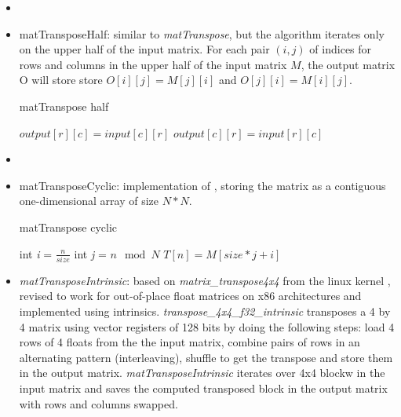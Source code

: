 \documentclass[conference]{IEEEtran}
\begin{document}
\begin{itemize}
\item \item{matTransposeHalf}: similar to \textit{matTranspose}, but the algorithm
  iterates only on the upper half of the input matrix. For each
  pair $(i,j)$ of indices for rows and columns in the upper half of the input matrix $M$, the output matrix O will
  store store $O[i][j]=M[j][i]$ and $O[j][i] = M[i][j]$.

  \begin{algorithm}
    \caption{matTranspose half}\label{matTranspose}
    \begin{algoritmic}[1]
            \State {}
            \State $output[r][c] = input[c][r]$
            \State $output[c][r] = input[r][c]$
            \EndFor
        \EndFor
      \EndProcedure
    \end{algoritmic}
  \end{algorithm}
  
\item \item{matTransposeCyclic}: implementation of \cite{b13}, storing the matrix as a contiguous one-dimensional array of size $N*N$.
  
  \begin{algorithm}
    \caption{matTranspose cyclic}\label{matTranspose}
    \begin{algoritmic}[1]
        \State int \textit{i} = $\frac{n}{size}$
        \State int \textit{j} = $n \mod N$
        $T[n] = M[size * j + i]$
        \EndFor
      \EndProcedure
    \end{algoritmic}
  \end{algorithm}

\item \textit{matTransposeIntrinsic}: based on \textit{matrix\_transpose4x4} from the linux kernel \cite{b16}, revised to work for out-of-place float matrices on x86 architectures and implemented using intrinsics. \textit{transpose\_4x4\_f32\_intrinsic} transposes a 4 by 4 matrix using vector registers of 128 bits by doing the following steps: load 4 rows of 4 floats from the the input matrix, combine pairs of rows in an alternating pattern (interleaving), shuffle to get the transpose and store them in the output matrix. \textit{matTransposeIntrinsic} iterates over 4x4 blockw in the input matrix and saves the computed transposed block in the output matrix with rows and columns swapped.


\end{itemize}
\end{document}
